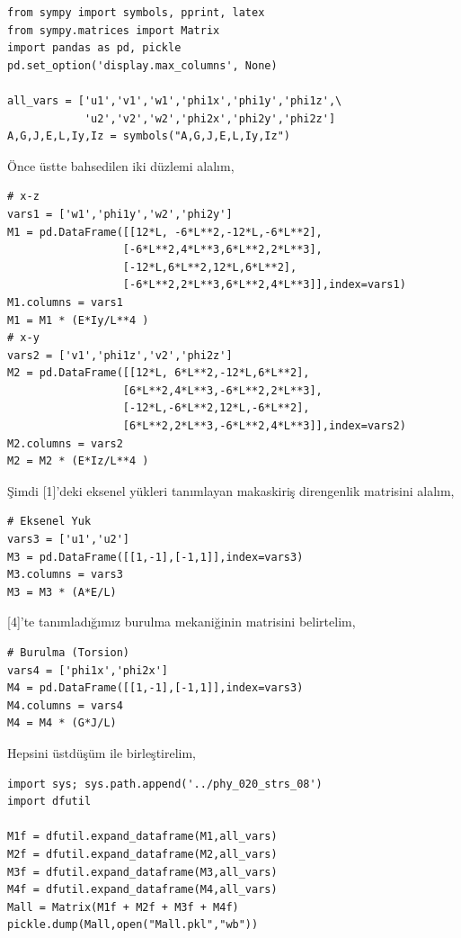 \documentclass[12pt,fleqn]{article}\usepackage{../../common}
\begin{document}
\begin{verbatim}
from sympy import symbols, pprint, latex
from sympy.matrices import Matrix
import pandas as pd, pickle
pd.set_option('display.max_columns', None)

all_vars = ['u1','v1','w1','phi1x','phi1y','phi1z',\
            'u2','v2','w2','phi2x','phi2y','phi2z']
A,G,J,E,L,Iy,Iz = symbols("A,G,J,E,L,Iy,Iz")
\end{verbatim}

Önce üstte bahsedilen iki düzlemi alalım,

\begin{verbatim}
# x-z
vars1 = ['w1','phi1y','w2','phi2y']
M1 = pd.DataFrame([[12*L, -6*L**2,-12*L,-6*L**2],
                  [-6*L**2,4*L**3,6*L**2,2*L**3],
                  [-12*L,6*L**2,12*L,6*L**2],
                  [-6*L**2,2*L**3,6*L**2,4*L**3]],index=vars1)
M1.columns = vars1
M1 = M1 * (E*Iy/L**4 )
# x-y
vars2 = ['v1','phi1z','v2','phi2z']
M2 = pd.DataFrame([[12*L, 6*L**2,-12*L,6*L**2],
                  [6*L**2,4*L**3,-6*L**2,2*L**3],
                  [-12*L,-6*L**2,12*L,-6*L**2],
                  [6*L**2,2*L**3,-6*L**2,4*L**3]],index=vars2)
M2.columns = vars2
M2 = M2 * (E*Iz/L**4 )
\end{verbatim}

Şimdi [1]'deki eksenel yükleri tanımlayan makaskiriş direngenlik matrisini
alalım,

\begin{verbatim}
# Eksenel Yuk
vars3 = ['u1','u2']
M3 = pd.DataFrame([[1,-1],[-1,1]],index=vars3)
M3.columns = vars3
M3 = M3 * (A*E/L)
\end{verbatim}

[4]'te tanımladığımız burulma mekaniğinin matrisini belirtelim,

\begin{verbatim}
# Burulma (Torsion)
vars4 = ['phi1x','phi2x']
M4 = pd.DataFrame([[1,-1],[-1,1]],index=vars3)
M4.columns = vars4
M4 = M4 * (G*J/L)
\end{verbatim}

Hepsini üstdüşüm ile birleştirelim,

\begin{verbatim}
import sys; sys.path.append('../phy_020_strs_08')
import dfutil

M1f = dfutil.expand_dataframe(M1,all_vars)
M2f = dfutil.expand_dataframe(M2,all_vars)
M3f = dfutil.expand_dataframe(M3,all_vars)
M4f = dfutil.expand_dataframe(M4,all_vars)
Mall = Matrix(M1f + M2f + M3f + M4f)
pickle.dump(Mall,open("Mall.pkl","wb"))
\end{verbatim}
\end{document}
